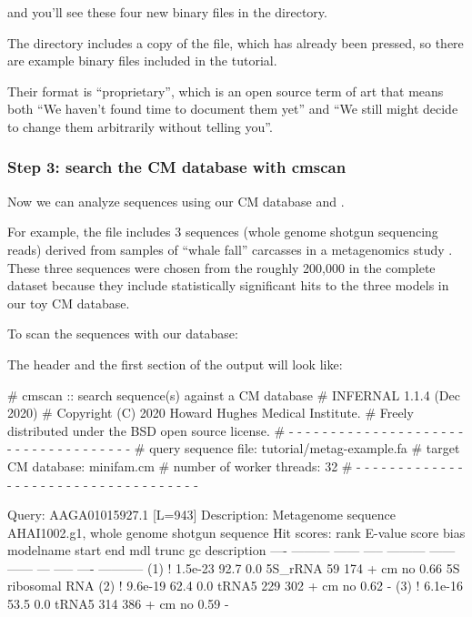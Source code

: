 and you'll see these four new binary files in the directory. 

The  directory includes a copy of the
 file, which has already been pressed, so there
are example binary files 
included in the tutorial.

Their format is ``proprietary'', which is an open source term of art
that means both ``We haven't found time to document them yet'' and ``We
still might decide to change them arbitrarily without telling you''.

\subsubsection{Step 3: search the CM database with cmscan}

Now we can analyze sequences using our CM database and
. 

For example, the file  includes 3
sequences (whole genome shotgun sequencing reads) derived from samples
of ``whale fall'' carcasses in a metagenomics study
\citep{Tringe05}. These three sequences were chosen from the roughly
200,000 in the complete dataset because they include statistically
significant hits to the three models in our toy CM database.

To scan the sequences with our database: 


The header and the first section of the output will look like:

\newpage

\begin{sreoutput}
# cmscan :: search sequence(s) against a CM database
# INFERNAL 1.1.4 (Dec 2020)
# Copyright (C) 2020 Howard Hughes Medical Institute.
# Freely distributed under the BSD open source license.
# - - - - - - - - - - - - - - - - - - - - - - - - - - - - - - - - - - - -
# query sequence file:                   tutorial/metag-example.fa
# target CM database:                    minifam.cm
# number of worker threads:              32
# - - - - - - - - - - - - - - - - - - - - - - - - - - - - - - - - - - - -

Query:       AAGA01015927.1  [L=943]
Description: Metagenome sequence AHAI1002.g1, whole genome shotgun sequence
Hit scores:
 rank     E-value  score  bias  modelname  start    end   mdl trunc   gc  description
 ----   --------- ------ -----  --------- ------ ------   --- ----- ----  -----------
  (1) !   1.5e-23   92.7   0.0  5S_rRNA       59    174 +  cm    no 0.66  5S ribosomal RNA
  (2) !   9.6e-19   62.4   0.0  tRNA5        229    302 +  cm    no 0.62  -
  (3) !   6.1e-16   53.5   0.0  tRNA5        314    386 +  cm    no 0.59  -
\end{sreoutput}

